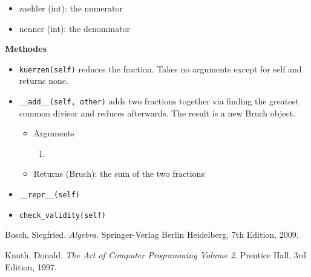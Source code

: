 \documentclass[refman]{scrartcl}
\begin{document}
\begin{itemize}
    \item zaehler (int): the numerator
    \item nenner (int): the denominator
\end{itemize}

\noindent\textbf{Methodes}

\begin{itemize}
    \item \texttt{kuerzen(self)} reduces the fraction. Takes no arguments except for self and returns none.
    \item \texttt{\_\_add\_\_(self, other)} adds two fractions together via finding the greatest common divisor and reduces afterwards. The result is a new Bruch object.
    \begin{itemize}
        \item Arguments
        \begin{enumerate}
            \item 
        \end{enumerate}
        \item Returns (Bruch): the sum of the two fractions
    \end{itemize}
    \item \texttt{\_\_repr\_\_(self)}
    \item \texttt{check\_validity(self)}
\end{itemize}


\begin{thebibliography}{9}
	Bosch, Siegfried. 
	\textit{Algebra}. 
	Springer-Verlag Berlin Heidelberg, 7th Edition, 2009.
	
	Knuth, Donald. 
	\textit{The Art of Computer Programming Volume 2}. 
	Prentice Hall, 3rd Edition, 1997.
	
\end{thebibliography}
\end{document}
